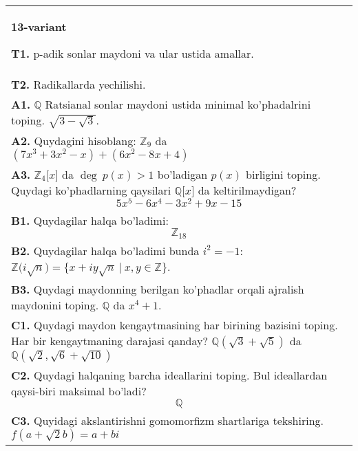 \documentclass{article}
\begin{document}
\begin{tabular}{m{17cm}}
\textbf{13-variant}
\newline

\textbf{T1.} p-adik sonlar maydoni va ular ustida amallar. \\
\textbf{T2.} Radikallarda yechilishi. \\
\textbf{A1.} \(\mathbb{Q}\) Ratsianal sonlar maydoni ustida minimal ko'phadalrini toping.
\(\sqrt{3 - \sqrt{3}}\). \\
\textbf{A2.} Quydagini hisoblang:
\(\mathbb{Z}_{9}\) da \(\left( 7x^{3} + 3x^{2} - x \right) + \left( 6x^{2} - 8x + 4 \right)\) \\
\textbf{A3.} \(\mathbb{Z}_{4}\lbrack x\rbrack\) da \(\deg\ p(x) > 1\) bo'ladigan \(p(x)\) birligini toping. Quydagi ko'phadlarning qaysilari \(\mathbb{Q\lbrack}x\rbrack\) da keltirilmaydigan?
\[5x^{5} - 6x^{4} - 3x^{2} + 9x - 15\] \\
\textbf{B1.} Quydagilar halqa bo'ladimi:
\[\mathbb{Z}_{18}\] \\
\textbf{B2.} Quydagilar halqa bo'ladimi bunda \(i^{2} = - 1\):
\(\mathbb{Z(}i\sqrt{n}) = \{ x + iy\sqrt{n}\ |\ x,y \in \mathbb{Z\}}\). \\
\textbf{B3.} Quydagi maydonning berilgan ko'phadlar orqali ajralish maydonini toping.
\(\mathbb{Q}\) da \(x^{4} + 1\). \\
\textbf{C1.} Quydagi maydon kengaytmasining har birining bazisini toping. Har bir kengaytmaning darajasi qanday?
\(\mathbb{Q}\left( \sqrt{3} + \sqrt{5} \right)\) da \(\mathbb{Q}\left( \sqrt{2},\sqrt{6} + \sqrt{10} \right)\) \\
\textbf{C2.} Quydagi halqaning barcha ideallarini toping. Bul ideallardan qaysi-biri maksimal bo'ladi?
\[\mathbb{Q}\] \\
\textbf{C3.} Quyidagi akslantirishni gomomorfizm shartlariga tekshiring. \(f\left( a + \sqrt{2}b \right) = a + bi\) \\

\end{tabular}
\vspace{1cm}
\end{document}

